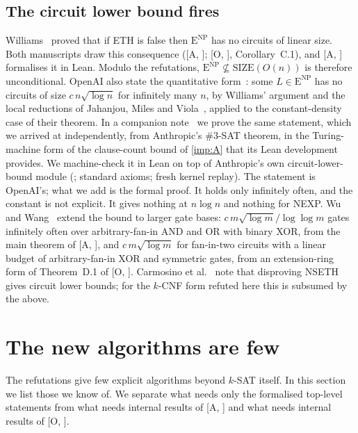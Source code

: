 \documentclass[10pt]{amsart}
\theoremstyle{plain}
\theoremstyle{definition}
\theoremstyle{remark}
\numberwithin{equation}{section}
\newcommand{\A}[1][]{\textup{[A\if\relax\detokenize{#1}\relax\else, #1\fi]}}
\newcommand{\Oa}[1][]{\textup{[O\if\relax\detokenize{#1}\relax\else, #1\fi]}}
\newcommand{\ENP}{\mathrm{E}^{\mathrm{NP}}}
\begin{document}
\subsection{The circuit lower bound fires}\label{sec:circuits}
Williams~\cite[Theorem~6.1]{Wil13} proved that if ETH is false then $\ENP$ has no circuits of
linear size. Both manuscripts draw this consequence (\A; \Oa, Corollary~C.1), and \A{}
formalises it in Lean. Modulo the refutations, $\ENP\not\subseteq\mathrm{SIZE}(O(n))$ is therefore
unconditional. OpenAI also state the quantitative form~\cite[Corollary~1.4]{OpenAI26}: some
$L\in\ENP$ has no circuits of size $c\,n\sqrt{\log n}$ for infinitely many $n$, by Williams'
argument and the local reductions of Jahanjou, Miles and Viola~\cite{JMV15}, applied to the
constant-density case of their theorem. In a companion note~\cite{TulsyanC26} we prove the same
statement, which we arrived at independently, from Anthropic's $\#3$-SAT theorem, in the
Turing-machine form of the clause-count bound of \cref{imp:A} that its Lean development provides.
We machine-check it in Lean on top of Anthropic's own circuit-lower-bound module
(; standard axioms; fresh kernel replay). The statement is OpenAI's;
what we add is the formal proof. It holds only infinitely often, and the constant is not
explicit. It gives nothing at $n\log n$ and nothing for NEXP.
Wu and Wang~\cite{WW26c} extend the bound to larger gate bases: $c\,m\sqrt{\log m}/\log\log m$
gates infinitely often over arbitrary-fan-in AND and OR with binary XOR, from the main theorem of
\A, and $c\,m\sqrt{\log m}$ for fan-in-two circuits with a linear budget of arbitrary-fan-in XOR and
symmetric gates, from an extension-ring form of Theorem~D.1 of \Oa.
Carmosino et al.~\cite{CGIMPS16} note that disproving NSETH gives circuit lower bounds; for the
$k$-CNF form refuted here this is subsumed by the above.

\section{The new algorithms are few}\label{sec:new}

The refutations give few explicit algorithms beyond $k$-SAT itself. In this section we list those
we know of. We separate what needs only the formalised top-level statements from what needs
internal results of \A{} and what needs internal results of \Oa.
\end{document}
